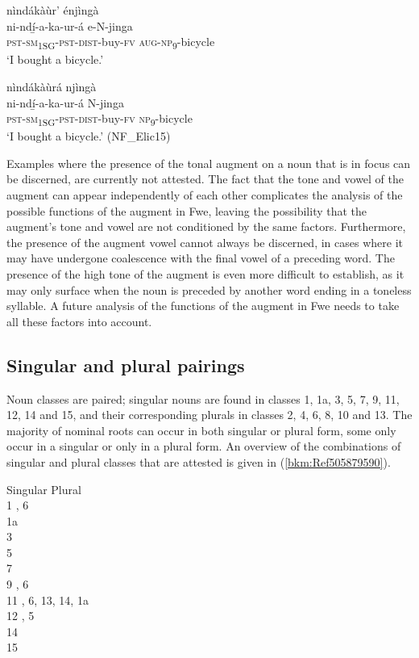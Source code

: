 \ea
\label{bkm:Ref498443060}
\ea
nìndákàùr’ énjìngà\\
\gll ni-ndí̲-a-ka-ur-á      e-N-jinga\\
\textsc{pst}-\textsc{sm}\textsubscript{1SG}-\textsc{pst}-\textsc{dist}-buy-\textsc{fv}  \textsc{aug}-\textsc{np}\textsubscript{9}-bicycle\\
\glt ‘I bought a bicycle.’

\ex
nìndákàùrá njìngà\\
\gll ni-ndí̲-a-ka-ur-á      N-jinga\\
\textsc{pst}-\textsc{sm}\textsubscript{1SG}-\textsc{pst}-\textsc{dist}-buy-\textsc{fv}  \textsc{np}\textsubscript{9}-bicycle\\
\glt ‘I bought a bicycle.’ (NF\_Elic15)
\z\z

Examples where the presence of the tonal augment on a noun that is in focus can be discerned, are currently not attested. The fact that the tone and vowel of the augment can appear independently of each other complicates the analysis of the possible functions of the augment in Fwe, leaving the possibility that the augment’s tone and vowel are not conditioned by the same factors. Furthermore, the presence of the augment vowel cannot always be discerned, in cases where it may have undergone coalescence with the final vowel of a preceding word. The presence of the high tone of the augment is even more difficult to establish, as it may only surface when the noun is preceded by another word ending in a toneless syllable. A future analysis of the functions of the augment in Fwe needs to take all these factors into account.

\subsection{Singular and plural pairings}
\label{bkm:Ref498941936}\hypertarget{Toc75352638}{}
Noun classes are paired; singular nouns are found in classes 1, 1a, 3, 5, 7, 9, 11, 12, 14 and 15, and their corresponding plurals in classes 2, 4, 6, 8, 10 and 13. The majority of nominal roots can occur in both singular or plural form, some only occur in a singular or only in a plural form. An overview of the combinations of singular and plural classes that are attested is given in (\ref{bkm:Ref505879590}).

\ea
\label{bkm:Ref505879590}
Singular \tab   Plural\\
1 , 6\\
1a  \\
3  \\
5   \\
7   \\
9   , 6\\
11 , 6, 13, 14, 1a\\
12   , 5\\
14  \\
15  
\z

